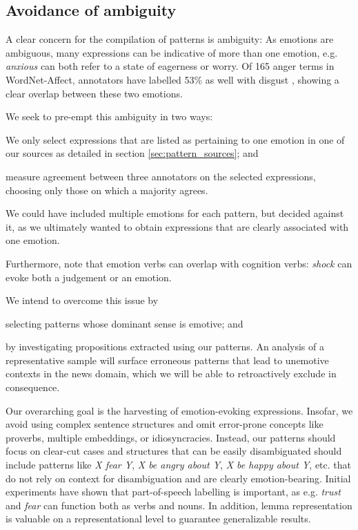 \subsection{Avoidance of ambiguity}

A clear concern for the compilation of patterns is ambiguity: As emotions are ambiguous, many expressions can be indicative of more than one emotion, e.g. \textit{anxious} can both refer to a state of eagerness or worry. Of 165 anger terms in WordNet-Affect, annotators have labelled 53\% as well with disgust \cite{nrc}, showing a clear overlap between these two emotions.

We seek to pre-empt this ambiguity in two ways: \begin{inparaenum} \item We only select expressions that are listed as pertaining to one emotion in one of our sources as detailed in section \ref{sec:pattern_sources}; and \item measure agreement between three annotators on the selected expressions, choosing only those on which a majority agrees. \end{inparaenum} We could have included multiple emotions for each pattern, but decided against it, as we ultimately wanted to obtain expressions that are clearly associated with one emotion.

Furthermore, \citeauthor{emotion_verbs} note that emotion verbs can overlap with cognition verbs: \textit{shock} can evoke both a judgement or an emotion. \begin{inparaenum} We intend to overcome this issue by \item selecting patterns whose dominant sense is emotive; and \item by investigating propositions extracted using our patterns. An analysis of a representative sample will surface erroneous patterns that lead to unemotive contexts in the news domain, which we will be able to retroactively exclude in consequence. \end{inparaenum}

Our overarching goal is the harvesting of emotion-evoking expressions. Insofar, we avoid using complex sentence structures and omit error-prone concepts like proverbs, multiple embeddings, or idiosyncracies. Instead, our patterns should focus on clear-cut cases and structures that can be easily disambiguated should include patterns like \textit{X fear Y}, \textit{X be angry about Y}, \textit{X be happy about Y}, etc. that do not rely on context for disambiguation and are clearly emotion-bearing. Initial experiments have shown that part-of-speech labelling is important, as e.g. \textit{trust} and \textit{fear} can function both as verbs and nouns. In addition, lemma representation is valuable on a representational level to guarantee generalizable results.

